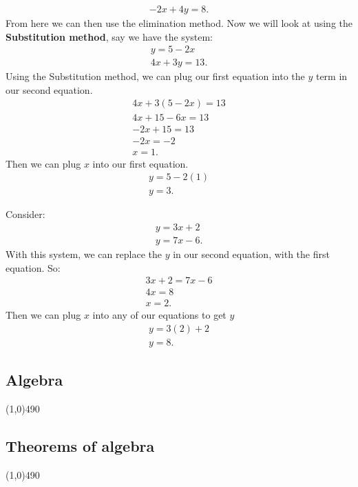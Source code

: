 \documentclass{report}
\begin{document}
      \begin{align*}
        -2x +4y = 8
      .\end{align*}
      \bigbreak \noindent 
      From here we can then use the elimination method.
    \pagebreak \bigbreak \noindent
      Now we will look at using the \textbf{Substitution method}, say we have the system:
      \begin{align*}
        y = 5-2x \\
        4x + 3y = 13
      .\end{align*}
      \bigbreak \noindent \bigbreak \noindent 
      Using the Substitution method, we can plug our first equation into the $y$ term in our second equation. 
      \begin{align*}
        4x + 3(5-2x)  =13\\
        4x + 15 -6x = 13 \\
        -2x + 15 = 13 \\
        -2x = -2 \\
        x= 1
      .\end{align*}
      \bigbreak \noindent \bigbreak \noindent 
      Then we can plug $x$ into our first equation.
      \begin{align*}
        y = 5-2(1) \\
        y = 3
      .\end{align*}

    \bigbreak \noindent 
      Consider:
      \begin{align*}
        y = 3x +2 \\
        y = 7x - 6
      .\end{align*}
      \bigbreak \noindent \bigbreak \noindent
      With this system, we can replace the $y $ in our second equation, with the first equation. So:
      \begin{align*}
        3x +2  = 7x - 6 \\
        4x = 8 \\
        x = 2
      .\end{align*}
      \bigbreak \noindent \bigbreak \noindent
      Then we can plug $x $ into any of our equations to get $y $
      \begin{align*}
        y = 3(2)  +2  \\
        y = 8
      .\end{align*}



    \pagebreak \bigbreak \noindent
    \begin{center}
      \section{\Large{Algebra}}
    \end{center}
    \line(1,0){490}
    \begin{center}
      \item \subsection{Theorems of algebra}
    \end{center}
    \line(1,0){490}
\end{document}
